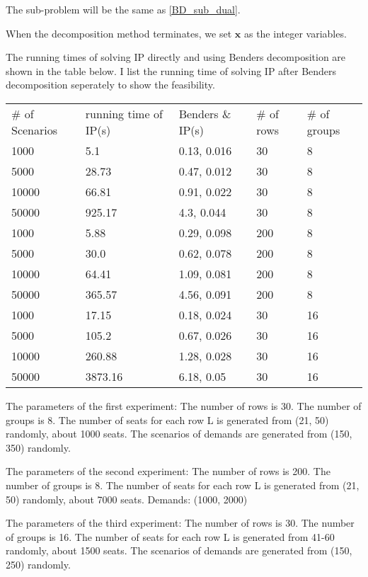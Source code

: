 The sub-problem will be the same as \eqref{BD_sub_dual}.

When the decomposition method terminates, we set $\mathbf{x}$ as the integer variables.

The running times of solving IP directly and using Benders decomposition are shown in the table below. I list the running time of solving IP after Benders decomposition seperately to show the feasibility.

\begin{table}[ht]
  \begin{tabular}{l|l|l|l|l}
  \hline
  \# of Scenarios & running time of IP(s) & Benders \& IP(s) & \# of rows & \# of groups \\
  1000  & 5.1  & 0.13, 0.016 & 30 & 8 \\
  5000  & 28.73 & 0.47, 0.012 & 30 & 8 \\
  10000 & 66.81  & 0.91, 0.022 & 30 & 8 \\
  50000 & 925.17 & 4.3, 0.044 & 30 & 8 \\
  \hline
  1000  & 5.88 & 0.29, 0.098 & 200 & 8 \\
  5000  & 30.0 & 0.62, 0.078 & 200 & 8 \\
  10000 & 64.41 & 1.09, 0.081 & 200 & 8 \\
  50000 & 365.57 & 4.56, 0.091 & 200 & 8 \\
  \hline
  1000  & 17.15  & 0.18, 0.024 & 30 & 16  \\
  5000  & 105.2  & 0.67, 0.026 & 30 & 16  \\
  10000 & 260.88 & 1.28, 0.028 & 30 & 16  \\
  50000 & 3873.16 & 6.18, 0.05  & 30 & 16  \\
  \hline
  \end{tabular}
\end{table}


The parameters of the first experiment:
The number of rows is 30.
The number of groups is 8.
The number of seats for each row L is generated from (21, 50) randomly, about 1000 seats.
The scenarios of demands are generated from (150, 350) randomly.


The parameters of the second experiment:
The number of rows is 200.
The number of groups is 8.
The number of seats for each row L is generated from (21, 50) randomly, about 7000 seats.
Demands: (1000, 2000)


The parameters of the third experiment:
The number of rows is 30.
The number of groups is 16.
The number of seats for each row L is generated from 41-60 randomly, about 1500 seats.
The scenarios of demands are generated from (150, 250) randomly.

